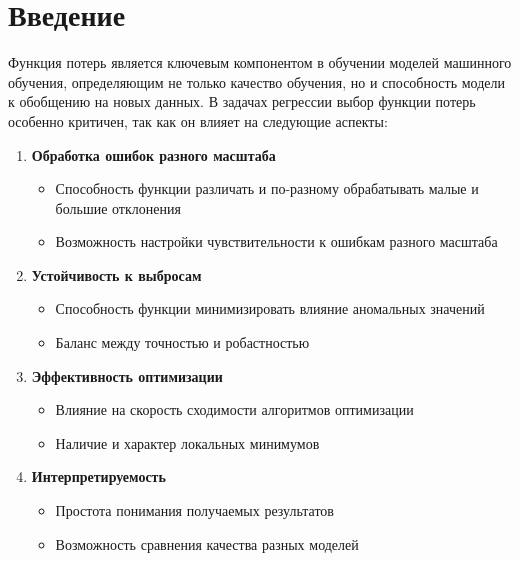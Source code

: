 

\section{Введение}

Функция потерь является ключевым компонентом в обучении моделей машинного обучения, определяющим не только качество обучения, но и способность модели к обобщению на новых данных. В задачах регрессии выбор функции потерь особенно критичен, так как он влияет на следующие аспекты:

\begin{enumerate}
    \item \textbf{Обработка ошибок разного масштаба}
          \begin{itemize}
              \item Способность функции различать и по-разному обрабатывать малые и большие отклонения
              \item Возможность настройки чувствительности к ошибкам разного масштаба
          \end{itemize}

    \item \textbf{Устойчивость к выбросам}
          \begin{itemize}
              \item Способность функции минимизировать влияние аномальных значений
              \item Баланс между точностью и робастностью
          \end{itemize}

    \item \textbf{Эффективность оптимизации}
          \begin{itemize}
              \item Влияние на скорость сходимости алгоритмов оптимизации
              \item Наличие и характер локальных минимумов
          \end{itemize}

    \item \textbf{Интерпретируемость}
          \begin{itemize}
              \item Простота понимания получаемых результатов
              \item Возможность сравнения качества разных моделей
          \end{itemize}
\end{enumerate}


